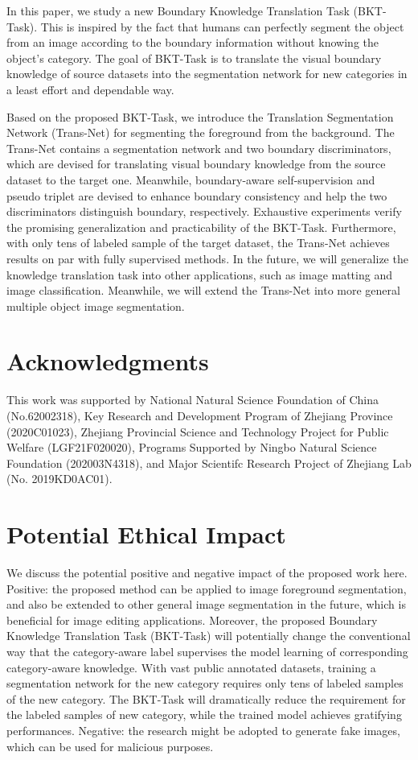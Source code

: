 \documentclass[letterpaper]{article} %
\begin{document}
In this paper, we study a new Boundary Knowledge Translation Task (BKT-Task). This is inspired by the fact that humans can perfectly segment the object from an image according to the boundary information without knowing the object's category.
The goal of BKT-Task is to translate the visual boundary knowledge of source datasets into the segmentation network for new categories
in a least effort and dependable way.

Based on the proposed BKT-Task, we introduce the Translation Segmentation Network (Trans-Net) for segmenting the foreground from the background. The Trans-Net contains a segmentation network and two boundary discriminators, which are devised for translating visual boundary knowledge from the source dataset to the target one. Meanwhile, boundary-aware self-supervision and pseudo triplet are devised to enhance boundary consistency and help the two discriminators distinguish boundary, respectively. Exhaustive experiments verify the promising generalization and practicability of the BKT-Task. Furthermore, with only tens of labeled sample of the target dataset, the Trans-Net achieves results on par with fully supervised methods. In the future, we will generalize the knowledge translation task into other applications, such as image matting and image classification. Meanwhile, we will extend the Trans-Net into more general multiple object image segmentation.

\section{ Acknowledgments}
This work was supported by National Natural Science Foundation of China (No.62002318), Key Research and Development Program of Zhejiang Province (2020C01023), Zhejiang Provincial Science and Technology Project for Public Welfare (LGF21F020020), Programs Supported by Ningbo Natural Science Foundation (202003N4318), and Major Scientifc Research Project of Zhejiang Lab (No. 2019KD0AC01).

\section*{Potential Ethical Impact }

We discuss the potential positive and negative impact of the proposed work here.  Positive: the proposed method can be applied to image foreground segmentation, and also  be extended to other general image segmentation in the future, which is beneficial for image editing applications.
Moreover, the proposed Boundary Knowledge
Translation Task (BKT-Task) will
potentially
change the conventional way that the category-aware label supervises the model learning of corresponding category-aware knowledge.
With vast public annotated datasets, training a segmentation network for the new category requires only tens of labeled samples of the new category. The BKT-Task will dramatically reduce the requirement for the labeled samples of new category, while the trained model  achieves gratifying performances. Negative: the research might be adopted to generate  fake images, which can be used for malicious purposes.



\end{document}
